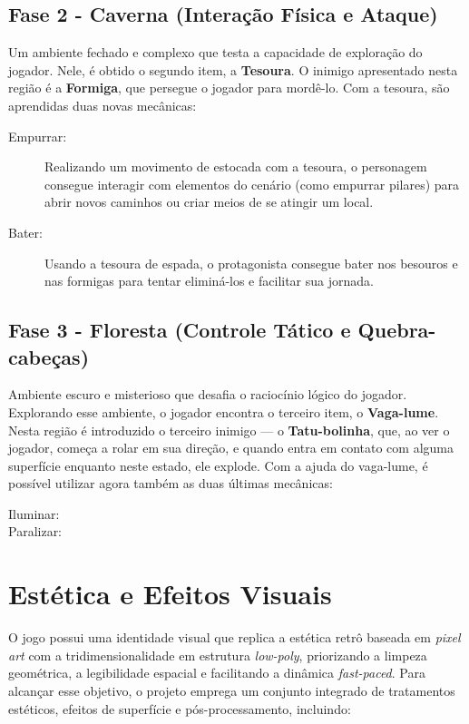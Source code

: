 \subsection{Fase 2 - Caverna (Interação Física e Ataque)}

Um ambiente fechado e complexo que testa a capacidade de exploração do jogador. Nele, é obtido
o segundo item, a \textbf{Tesoura}. O inimigo apresentado nesta região é a \textbf{Formiga}, que persegue o jogador
para mordê-lo. Com a tesoura, são aprendidas duas novas mecânicas:

\begin{description}
	\item[Empurrar:] Realizando um movimento de estocada com a tesoura, o personagem consegue
	interagir com elementos do cenário (como empurrar pilares) para abrir novos caminhos ou
	criar meios de se atingir um local.
	\item[Bater:] Usando a tesoura de espada, o protagonista consegue bater nos besouros e
	nas formigas para tentar eliminá-los e facilitar sua jornada.
\end{description}

\subsection{Fase 3 - Floresta (Controle Tático e Quebra-cabeças)}

Ambiente escuro e misterioso que desafia o raciocínio lógico do jogador. Explorando esse ambiente,
o jogador encontra o terceiro item, o \textbf{Vaga-lume}. Nesta região é introduzido o terceiro inimigo --- o
\textbf{Tatu-bolinha}, que, ao ver o jogador, começa a rolar em sua direção, e quando entra em contato com
alguma superfície enquanto neste estado, ele explode. Com a ajuda do vaga-lume, é possível utilizar
agora também as duas últimas mecânicas:

\begin{description}
	\item[Iluminar:] 
	\item[Paralizar:] 
\end{description}

\section{Estética e Efeitos Visuais}
\label{sec:estetica_e_efeitos}

O jogo possui uma identidade visual que replica a estética retrô
baseada em \textit{pixel art} com a tridimensionalidade em estrutura \textit{low-poly},
priorizando a limpeza geométrica, a legibilidade espacial e facilitando a
dinâmica \textit{fast-paced}. Para alcançar esse objetivo, o projeto emprega um
conjunto integrado de tratamentos estéticos, efeitos de superfície e pós-processamento,
incluindo:

